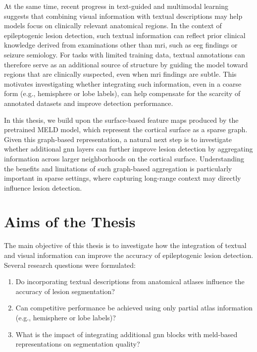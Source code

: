\documentclass[FCD_GNN.tex]{subfiles}
\begin{document}
At the same time, recent progress in text-guided and multimodal learning suggests that combining visual information with textual descriptions may help models focus on clinically relevant anatomical regions.  
In the context of epileptogenic lesion detection, such textual information can reflect prior clinical knowledge derived from examinations other than \ac{mri}, such as \ac{eeg} findings or seizure semiology.  
For tasks with limited training data, textual annotations can therefore serve as an additional source of structure by guiding the model toward regions that are clinically suspected, even when \ac{mri} findings are subtle.  
This motivates investigating whether integrating such information, even in a coarse form (e.g., hemisphere or lobe labels), can help compensate for the scarcity of annotated datasets and improve detection performance.

In this thesis, we build upon the surface-based feature maps produced by the pretrained MELD model, which represent the cortical surface as a sparse graph.  
Given this graph-based representation, a natural next step is to investigate whether additional \ac{gnn} layers can further improve lesion detection by aggregating information across larger neighborhoods on the cortical surface.  
Understanding the benefits and limitations of such graph-based aggregation is particularly important in sparse settings, where capturing long-range context may directly influence lesion detection.

\section{Aims of the Thesis}
The main objective of this thesis is to investigate how the integration of textual and visual information 
can improve the accuracy of epileptogenic lesion detection. 
Several research questions were formulated:

\begin{enumerate}
    \item Do incorporating textual descriptions from anatomical atlases influence the accuracy of lesion segmentation?
    \item Can competitive performance be achieved using only partial atlas information (e.g., hemisphere or lobe labels)?
    \item What is the impact of integrating additional \ac{gnn} blocks with \ac{meld}-based representations on segmentation quality?
\end{enumerate}
\end{document}
